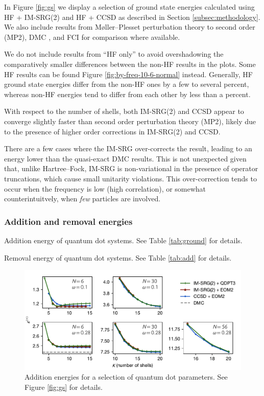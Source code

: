 In Figure \ref{fig:gs} we display a selection of ground state energies calculated using HF + IM-SRG(2) and HF + CCSD as described in Section \ref{subsec:methodology}.  We also include results from M\o ller--Plesset perturbation theory to second order (MP2), DMC \cite{hoegberget2013thesis}, and FCI \cite{olsen2013thesis} for comparison where available.

We do not include results from ``HF only'' to avoid overshadowing the comparatively smaller differences between the non-HF results in the plots.  Some HF results can be found Figure \ref{fig:by-freq-10-6-normal} instead.  Generally, HF ground state energies differ from the non-HF ones by a few to several percent, whereas non-HF energies tend to differ from each other by less than a percent.

With respect to the number of shells, both IM-SRG(2) and CCSD appear to converge slightly faster than second order perturbation theory (MP2), likely due to the presence of higher order corrections in IM-SRG(2) and CCSD.

There are a few cases where the IM-SRG over-corrects the result, leading to an energy lower than the quasi-exact DMC results.  This is not unexpected given that, unlike Hartree--Fock, IM-SRG is non-variational in the presence of operator truncations, which cause small unitarity violations.  This over-correction tends to occur when the frequency is low (high correlation), or somewhat counterintuitvely, when \emph{few} particles are involved.

\subsubsection{Addition and removal energies}

\begin{table}
  \centering
  \caption{Addition energy of quantum dot systems.  See Table \ref{tab:ground} for details.}
  \label{tab:add}
  
\end{table}

\begin{table}
  \centering
  \caption{Removal energy of quantum dot systems.  See Table \ref{tab:add} for details.}
  \label{tab:rm}
  
\end{table}

\begin{figure}
  \centering
  \includegraphics{fig-add2}
  \caption{Addition energies for a selection of quantum dot parameters.  See Figure \ref{fig:gs} for details.}
  \label{fig:add}
\end{figure}

